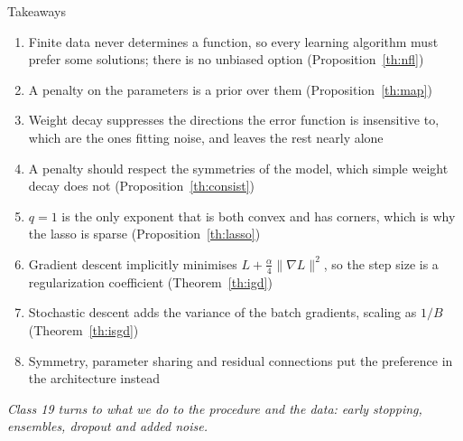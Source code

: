 \documentclass[aspectratio=169, 11pt]{beamer}
\newcommand{\bridge}[1]{%
  {\scriptsize\itshape\color{mcMuted} #1\par}\vspace{0.35em}}
\begin{document}
\begin{frame}{Takeaways}
  \vspace{0.1em}
  {\scriptsize
  \begin{enumerate}\itemsep0.34em
    \item Finite data never determines a function, so every learning
          algorithm must prefer some solutions; there is no unbiased
          option (Proposition~\ref{th:nfl})
    \item A penalty on the parameters is a prior over them
          (Proposition~\ref{th:map})
    \item Weight decay suppresses the directions the error function is
          insensitive to, which are the ones fitting noise, and leaves
          the rest nearly alone
    \item A penalty should respect the symmetries of the model, which
          simple weight decay does not (Proposition~\ref{th:consist})
    \item $q = 1$ is the only exponent that is both convex and has
          corners, which is why the lasso is sparse
          (Proposition~\ref{th:lasso})
    \item Gradient descent implicitly minimises
          $L + \tfrac{\alpha}{4}\|\nabla L\|^2$, so the step size is a
          regularization coefficient (Theorem~\ref{th:igd})
    \item Stochastic descent adds the variance of the batch gradients,
          scaling as $1/B$ (Theorem~\ref{th:isgd})
    \item Symmetry, parameter sharing and residual connections put the
          preference in the architecture instead
  \end{enumerate}}
  \bridge{Class 19 turns to what we do to the procedure and the data:
  early stopping, ensembles, dropout and added noise.}
\end{frame}
\end{document}
